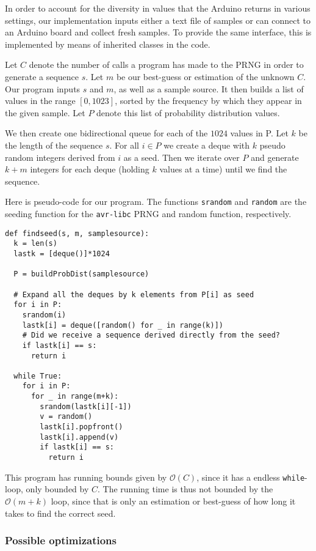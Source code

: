 \documentclass[a4paper]{article}           %
\begin{document}
In order to account for the diversity in values that the Arduino returns in various settings, our implementation inputs either a text file of samples or can connect to an Arduino board and collect fresh samples. To provide the same interface, this is implemented by means of inherited classes in the code. 

Let $C$ denote the number of calls a program has made to the PRNG in order to generate a sequence $s$. Let $m$ be our best-guess or estimation of the unknown $C$. Our program inputs $s$ and $m$, as well as a sample source. It then builds a list of values in the range $[0, 1023]$, sorted by the frequency by which they appear in the given sample. Let $P$ denote this list of probability distribution values.

We then create one bidirectional queue for each of the $1024$ values in P. Let $k$ be the length of the sequence $s$. For all $i \in P$ we create a deque with $k$ pseudo random integers derived from $i$ as a seed. Then we iterate over $P$ and generate $k+m$ integers for each deque (holding $k$ values at a time) until we find the sequence. 

Here is pseudo-code for our program. The functions \texttt{srandom} and \texttt{random} are the seeding function for the \texttt{avr-libc} PRNG and random function, respectively. 

\begin{lstlisting}[caption=Finding the seed]
def findseed(s, m, samplesource):
  k = len(s)
  lastk = [deque()]*1024

  P = buildProbDist(samplesource)

  # Expand all the deques by k elements from P[i] as seed
  for i in P:
    srandom(i)
    lastk[i] = deque([random() for _ in range(k)])
    # Did we receive a sequence derived directly from the seed?
    if lastk[i] == s:
      return i

  while True:
    for i in P:
      for _ in range(m+k):
        srandom(lastk[i][-1])
        v = random()
        lastk[i].popfront()
        lastk[i].append(v)
        if lastk[i] == s:
          return i
\end{lstlisting}

This program has running bounds given by $\mathcal{O}(C)$, since it has a endless \texttt{while}-loop, only bounded by $C$. The running time is thus not bounded by the $\mathcal{O}(m+k)$ loop, since that is only an estimation or best-guess of how long it takes to find the correct seed. 

\subsubsection{Possible optimizations}
\end{document}

